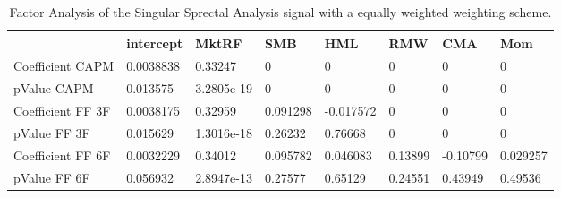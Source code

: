 \begin{table}[H]
\centering
\begin{tabular}{llllllll}
& intercept & MktRF & SMB & HML & RMW & CMA & Mom \\ 
\hline 
Coefficient CAPM & 0.0038838 & 0.33247 & 0 & 0 & 0 & 0 & 0 \\ 
pValue CAPM & 0.013575 & 3.2805e-19 & 0 & 0 & 0 & 0 & 0 \\ 
Coefficient FF 3F & 0.0038175 & 0.32959 & 0.091298 & -0.017572 & 0 & 0 & 0 \\ 
pValue FF 3F & 0.015629 & 1.3016e-18 & 0.26232 & 0.76668 & 0 & 0 & 0 \\ 
Coefficient FF 6F & 0.0032229 & 0.34012 & 0.095782 & 0.046083 & 0.13899 & -0.10799 & 0.029257 \\ 
pValue FF 6F & 0.056932 & 2.8947e-13 & 0.27577 & 0.65129 & 0.24551 & 0.43949 & 0.49536 \\ 
\hline
\end{tabular}
\caption{Factor Analysis of the Singular Sprectal Analysis signal with a equally weighted weighting scheme.}
\label{SSA_EW_FACTOR}
\end{table}